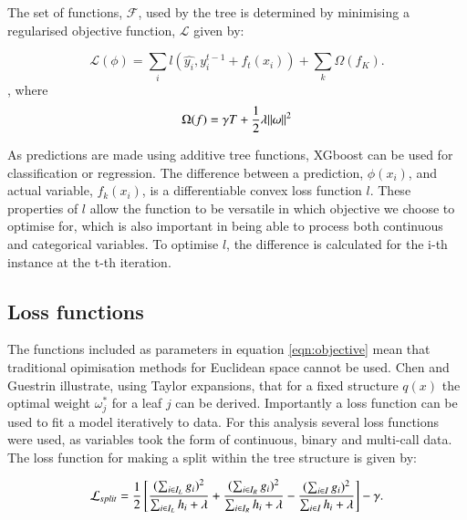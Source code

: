 \documentclass[review,12pt,authoryear]{elsarticle}
\begin{document}
\begin{linenumbers}
The set of functions, $\mathcal{F}$, used by the tree is determined by minimising a regularised objective function, $\mathcal{L}$ given by:

\begin{equation}\label{eqn:objective}
 \mathcal{L}(\phi)=\sum_i l(\hat{y_i}, y_i^{t-1} + f_t(x_i)) + \sum_k \Omega (f_K).
\end{equation}, where
\begin{equation}
  \Omega(f) = \gamma T + {{1}\over{2}}\lambda ||\omega||^2
\end{equation}

As predictions are made using additive tree functions, XGboost can be used for classification or regression. The difference between a prediction, $\phi(x_i)$, and actual variable, $f_{k}(x_i)$, is a differentiable convex loss function $l$. These properties of $l$ allow the function to be versatile in which objective we choose to optimise for, which is also important in being able to process both continuous and categorical variables. To optimise $l$, the difference is calculated for the i-th instance at the t-th iteration.
\subsection{Loss functions}

The functions included as parameters in equation \ref{eqn:objective} mean that traditional opimisation methods for Euclidean space cannot be used. Chen and Guestrin \citep{chenXGBoostScalableTree2016} illustrate, using Taylor expansions, that for a fixed structure $q(x)$ the optimal weight $\omega^*_j$ for a leaf $j$ can be derived. Importantly a loss function can be used to fit a model iteratively to data. For this analysis several loss functions were used, as variables took the form of continuous, binary and multi-call data. The loss function for making a split within the tree structure is given by:

\begin{equation} \label{eqn:enumerate}
\mathcal{L}_{split} = {{1}\over{2}} \left[ 
 {{(\sum_{i\in I_L}g_i)^{2}}\over{\sum_{i\in I_L} h_i + \lambda}} +
 {{(\sum_{i\in I_R}g_i)^{2}}\over{\sum_{i\in I_R} h_i + \lambda}} -
 {{(\sum_{i\in I}{g_i})^{2}}\over{\sum_{i \in I} h_i + \lambda}} \right] - \gamma.
\end{equation}


\end{linenumbers}
\end{document}
